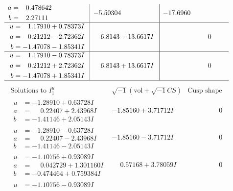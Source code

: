 \documentclass[1p]{elsarticle_modified}
\theoremstyle{definition}
\newcommand{\I}{\sqrt{-1}}
\begin{document}
$$\begin{array}{c|c|c}
\begin{aligned}
a &= \phantom{-}0.478642\phantom{ +0.000000I} \\
b &= \phantom{-}2.27111\phantom{ +0.000000I}\end{aligned}
 & -5.50304\phantom{ +0.000000I} & -17.6960\phantom{ +0.000000I} \\ \hline\begin{aligned}
u &= \phantom{-}1.17910 + 0.78373 I \\
a &= \phantom{-}0.21212 - 2.72362 I \\
b &= -1.47078 - 1.85341 I\end{aligned}
 & \phantom{-}6.8143 - 13.6617 I & \phantom{-0.000000 } 0 \\ \hline\begin{aligned}
u &= \phantom{-}1.17910 - 0.78373 I \\
a &= \phantom{-}0.21212 + 2.72362 I \\
b &= -1.47078 + 1.85341 I\end{aligned}
 & \phantom{-}6.8143 + 13.6617 I & \phantom{-0.000000 } 0\\
 \hline 
 \end{array}$$\newpage$$\begin{array}{c|c|c}  
\text{Solutions to }I^u_{1}& \I (\text{vol} + \sqrt{-1}CS) & \text{Cusp shape}\\
 \hline 
\begin{aligned}
u &= -1.28910 + 0.63728 I \\
a &= \phantom{-}0.22407 + 2.43968 I \\
b &= -1.41146 + 2.05143 I\end{aligned}
 & -1.85160 + 3.71712 I & \phantom{-0.000000 } 0 \\ \hline\begin{aligned}
u &= -1.28910 - 0.63728 I \\
a &= \phantom{-}0.22407 - 2.43968 I \\
b &= -1.41146 - 2.05143 I\end{aligned}
 & -1.85160 - 3.71712 I & \phantom{-0.000000 } 0 \\ \hline\begin{aligned}
u &= -1.10756 + 0.93089 I \\
a &= \phantom{-}0.042729 + 1.301160 I \\
b &= -0.474464 + 0.759384 I\end{aligned}
 & \phantom{-}0.57168 + 3.78059 I & \phantom{-0.000000 } 0 \\ \hline\begin{aligned}
u &= -1.10756 - 0.93089 I \\

\end{aligned}
\end{array}$$
\end{document}
